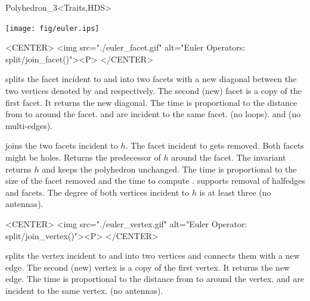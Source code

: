 \begin{ccClassTemplate}{Polyhedron_3<Traits,HDS>}
\begin{ccTexOnly}
    \begin{center}
      \parbox{\textwidth}{%
          \texttt{[image: fig/euler.ips]}%
      }
    \end{center}
\end{ccTexOnly}

\begin{ccHtmlOnly}
    <CENTER>
    <img src="./euler_facet.gif" alt="Euler Operators: split/join_facet()"><P>
    </CENTER>
\end{ccHtmlOnly}


    {splits the facet incident to  and  into two facets
      with a new diagonal between the two vertices denoted by  and
       respectively. The second (new) facet is a copy of the
      first facet. It returns the new diagonal. The time is
      proportional to the distance from  to  around the facet.
    \ccPrecond {} and  are incident to the same facet.
                (no loops).  and
                (no multi-edges).}

    {joins the two facets incident to $h$. The facet incident to
       gets removed. Both facets might be
    holes. Returns the predecessor of $h$ around the facet. The invariant
     returns $h$ and keeps
    the polyhedron unchanged. The time is proportional to the size of the
    facet removed and the time to compute .
    \ccPrecond {} supports removal of halfedges and facets. The
    degree of both vertices incident to $h$ is at least three (no antennas).}

\begin{ccHtmlOnly}
    <CENTER>
    <img src="./euler_vertex.gif" alt="Euler Operator: split/join_vertex()"><P>
    </CENTER>
\end{ccHtmlOnly}

    {splits the vertex incident to  and  into two vertices
      and connects them with a new edge. The second (new) vertex is a
      copy of the first vertex. It returns the new edge. The time is
      proportional to the distance from  to  around the vertex.
    \ccPrecond {} and  are incident to the same vertex.
                (no antennas).}


\end{ccClassTemplate}
